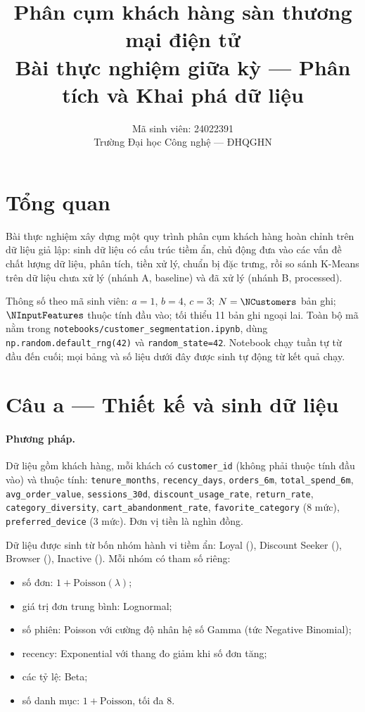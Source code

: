 \documentclass[11pt,a4paper]{article}
\title{Phân cụm khách hàng sàn thương mại điện tử\\
\large Bài thực nghiệm giữa kỳ — Phân tích và Khai phá dữ liệu}
\author{Mã sinh viên: 24022391 \\ Trường Đại học Công nghệ — ĐHQGHN}
\date{}
\begin{document}
\maketitle

\section*{Tổng quan}

Bài thực nghiệm xây dựng một quy trình phân cụm khách hàng hoàn chỉnh trên dữ liệu giả lập: sinh dữ liệu có cấu trúc tiềm ẩn, chủ động đưa vào các vấn đề chất lượng dữ liệu, phân tích, tiền xử lý, chuẩn bị đặc trưng, rồi so sánh K-Means trên dữ liệu chưa xử lý (nhánh A, baseline) và đã xử lý (nhánh B, processed).

Thông số theo mã sinh viên: $a=1$, $b=4$, $c=3$; $N=\NCustomers$ bản ghi; $\NInputFeatures$ thuộc tính đầu vào; tối thiểu 11 bản ghi ngoại lai. Toàn bộ mã nằm trong \texttt{notebooks/customer\_segmentation.ipynb}, dùng \texttt{np.random.default\_rng(42)} và \texttt{random\_state=42}. Notebook chạy tuần tự từ đầu đến cuối; mọi bảng và số liệu dưới đây được sinh tự động từ kết quả chạy.

\section{Câu a — Thiết kế và sinh dữ liệu}

\paragraph{Phương pháp.}
Dữ liệu gồm \NCustomers{} khách hàng, mỗi khách có \texttt{customer\_id} (không phải thuộc tính đầu vào) và \NInputFeatures{} thuộc tính: \texttt{tenure\_months}, \texttt{recency\_days}, \texttt{orders\_6m}, \texttt{total\_spend\_6m}, \texttt{avg\_order\_value}, \texttt{sessions\_30d}, \texttt{discount\_usage\_rate}, \texttt{return\_rate}, \texttt{category\_diversity}, \texttt{cart\_abandonment\_rate}, \texttt{favorite\_category} (8 mức), \texttt{preferred\_device} (3 mức). Đơn vị tiền là nghìn đồng.

Dữ liệu được sinh từ bốn nhóm hành vi tiềm ẩn: Loyal (\SegLoyal), Discount Seeker (\SegDiscount), Browser (\SegBrowser), Inactive (\SegInactive). Mỗi nhóm có tham số riêng:
\begin{itemize}
  \item số đơn: $1 + \text{Poisson}(\lambda)$;
  \item giá trị đơn trung bình: Lognormal;
  \item số phiên: Poisson với cường độ nhân hệ số Gamma (tức Negative Binomial);
  \item recency: Exponential với thang đo giảm khi số đơn tăng;
  \item các tỷ lệ: Beta;
  \item số danh mục: $1 + \text{Poisson}$, tối đa 8.
\end{itemize}
\end{document}
